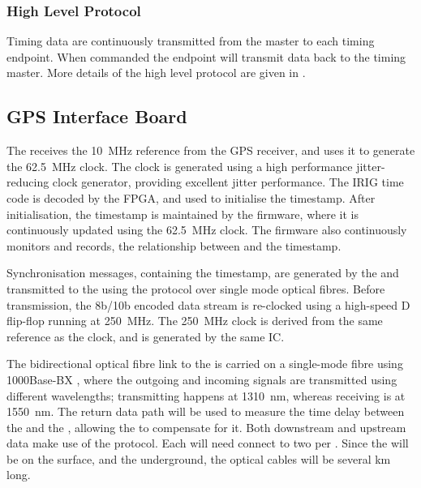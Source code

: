 \documentclass{dune}
\begin{document}
\subsubsection{High Level Protocol}

Timing data are continuously transmitted from the master to each timing endpoint. When commanded the endpoint will transmit data back to the timing master. More details of the high level protocol are given in \cite{ref:dts_high_level_protocol}.

\subsection{GPS Interface Board}
The  receives the \SI{10}{\MHz} reference from the GPS receiver, and uses it to generate the \SI{62.5}{\MHz}  clock. The clock is generated using a high performance jitter-reducing clock generator, providing excellent jitter performance. The IRIG time code is decoded by the  FPGA, and used to initialise the  timestamp. After initialisation, the  timestamp is maintained by the  firmware, where it is continuously updated using the \SI{62.5}{\MHz} clock. The firmware also continuously monitors and records, the relationship between  and the  timestamp.

Synchronisation messages, containing the  timestamp, are generated by the  and transmitted to the  using the  protocol over single mode optical fibres. Before transmission, the 8b/10b encoded  data stream is re-clocked using a high-speed D flip-flop running at \SI{250}{\MHz}. The \SI{250}{\MHz} clock is derived from the same reference as the  clock, and is generated by the same IC.

The bidirectional optical fibre link to the  is carried on a single-mode fibre using 1000Base-BX , where the outgoing and incoming signals are transmitted using different wavelengths; transmitting happens at \SI{1310}{nm}, whereas receiving is at \SI{1550}{nm}. The return data path will be used to measure the time delay between the  and the , allowing the  to compensate for it. Both downstream and upstream data make use of the  protocol. Each  will need connect to two  per . Since the  will be on the surface, and the  underground, the optical cables will be several km long.
\end{document}
